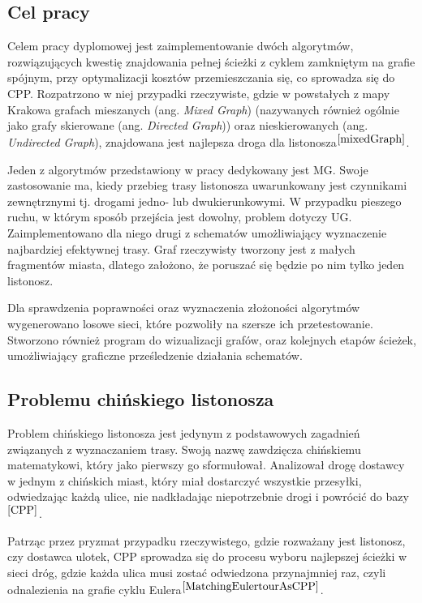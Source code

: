 \documentclass[a4paper, 12pt, twoside, openright]{article}
\begin{document}
\subsection{Cel pracy}
	\indent\par
	Celem pracy dyplomowej jest zaimplementowanie dwóch algorytmów, rozwiązujących kwestię znajdowania pełnej ścieżki z cyklem zamkniętym na grafie spójnym, przy optymalizacji kosztów przemieszczania się, co sprowadza się do CPP. 
	Rozpatrzono w niej przypadki rzeczywiste, gdzie w powstałych z mapy Krakowa grafach mieszanych (ang. \textit{Mixed Graph}) (nazywanych również ogólnie jako grafy skierowane (ang. \textit{Directed Graph})) oraz nieskierowanych (ang. \textit{Undirected Graph}), znajdowana jest najlepsza droga dla listonosza$^{\cite{mixedGraph}}$.


	Jeden z algorytmów przedstawiony w pracy dedykowany jest MG. Swoje zastosowanie ma, kiedy przebieg trasy listonosza uwarunkowany jest czynnikami zewnętrznymi tj. drogami jedno- lub dwukierunkowymi. 
	W przypadku pieszego ruchu, w którym sposób przejścia jest  dowolny, problem dotyczy UG. Zaimplementowano dla niego drugi z schematów umożliwiający wyznaczenie najbardziej efektywnej trasy. Graf rzeczywisty tworzony jest z małych fragmentów miasta, dlatego założono, że poruszać się będzie po nim tylko jeden listonosz. 


	Dla sprawdzenia poprawności oraz wyznaczenia złożoności algorytmów wygenerowano losowe sieci, które pozwoliły na szersze ich przetestowanie. 
	Stworzono również program do wizualizacji grafów, oraz kolejnych etapów ścieżek, umożliwiający graficzne prześledzenie działania schematów.




\subsection{Problemu chińskiego listonosza}
	\indent\par
	Problem chińskiego listonosza jest jedynym z podstawowych zagadnień związanych z wyznaczaniem trasy. Swoją nazwę zawdzięcza chińskiemu matematykowi, który jako pierwszy go sformułował. Analizował drogę dostawcy w jednym z chińskich miast, który miał dostarczyć wszystkie przesyłki, odwiedzając każdą ulice, nie nadkładając niepotrzebnie drogi i powrócić do bazy$^{{\cite{CPP}}}$. 
	
	Patrząc przez pryzmat przypadku rzeczywistego, gdzie rozważany jest listonosz, czy dostawca ulotek, CPP sprowadza się do procesu wyboru najlepszej ścieżki w sieci dróg, gdzie  każda ulica musi zostać odwiedzona przynajmniej raz, czyli odnalezienia na grafie cyklu Eulera$^{\cite{MatchingEulertourAsCPP}}$. 
\end{document}

